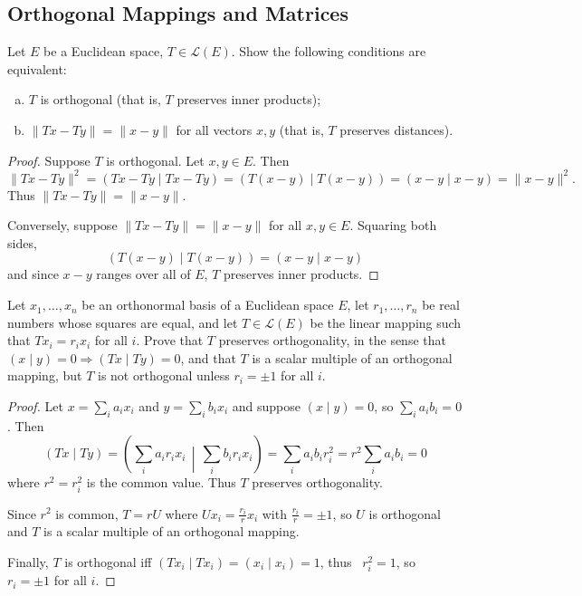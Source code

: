\subsection{Orthogonal Mappings and Matrices}

\begin{tcolorbox}[title=Problem 1, breakable]
Let $E$ be a Euclidean space, $T \in \mathcal{L}(E)$. Show the following conditions are equivalent:
\begin{enumerate}[(a)]
    \item $T$ is orthogonal (that is, $T$ preserves inner products);
    \item $\|Tx - Ty\| = \|x - y\|$ for all vectors $x, y$ (that is, $T$ preserves distances).
\end{enumerate}
\end{tcolorbox}

\begin{proof}
    Suppose $T$ is orthogonal. Let $x, y \in E$. Then
    \[\|Tx - Ty\|^2 = (Tx - Ty \mid Tx - Ty) = (T(x-y) \mid T(x-y)) = (x-y \mid x-y) = \|x-y\|^2.\]
    Thus $\|Tx - Ty\| = \|x - y\|$.

    Conversely, suppose $\|Tx - Ty\| = \|x - y\|$ for all $x, y \in E$. Squaring both sides,
    \[(T(x-y) \mid T(x-y)) = (x-y \mid x-y)\]
    and since $x - y$ ranges over all of $E$, $T$ preserves inner products.
\end{proof}

\begin{tcolorbox}[title=Problem 2, breakable]
Let $x_1, \ldots, x_n$ be an orthonormal basis of a Euclidean space $E$, let $r_1, \ldots, r_n$ be real numbers whose squares are equal, and let $T \in \mathcal{L}(E)$ be the linear mapping such that $Tx_i = r_i x_i$ for all $i$. Prove that $T$ preserves orthogonality, in the sense that $(x \mid y) = 0 \Rightarrow (Tx \mid Ty) = 0$, and that $T$ is a scalar multiple of an orthogonal mapping, but $T$ is not orthogonal unless $r_i = \pm 1$ for all $i$.
\end{tcolorbox}

\begin{proof}
    Let $x = \sum_i a_i x_i$ and $y = \sum_i b_i x_i$ and suppose $(x \mid y) = 0$, so $\sum_i a_i b_i = 0$. Then
    \[(Tx \mid Ty) = \left(\sum_i a_i r_i x_i \,\middle|\, \sum_i b_i r_i x_i\right) = \sum_i a_i b_i r_i^2 = r^2 \sum_i a_i b_i = 0\]
    where $r^2 = r_i^2$ is the common value. Thus $T$ preserves orthogonality.

    Since $r^2$ is common, $T = rU$ where $U x_i = \frac{r_i}{r} x_i$ with $\frac{r_i}{r} = \pm 1$,
    so $U$ is orthogonal and $T$ is a scalar multiple of an orthogonal mapping.

    Finally, $T$ is orthogonal iff $(Tx_i \mid Tx_i) = (x_i \mid x_i) = 1$, thus \ $r_i^2 = 1$,
    so \ $r_i = \pm 1$ for all $i$.
\end{proof}


